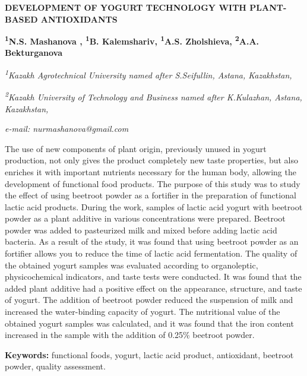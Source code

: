 \begin{articleheader}
{\bfseries DEVELOPMENT OF YOGURT TECHNOLOGY WITH PLANT-BASED ANTIOXIDANTS}

{\bfseries
\textsuperscript{1}N.S. Mashanova\textsuperscript{\envelope } ,
\textsuperscript{1}B. Kalemshariv,
\textsuperscript{1}A.S. Zholshieva,
\textsuperscript{2}A.A. Bekturganova}
\end{articleheader}

\begin{affiliation}
\emph{\textsuperscript{1}Kazakh Agrotechnical University named after S.Seifullin, Astana, Kazakhstan,}

\emph{\textsuperscript{2}Kazakh University of Technology and Business named after K.Kulazhan, Astana, Kazakhstan,}

\emph{e-mail: nurmashanova@gmail.com}
\end{affiliation}

The use of new components of plant origin, previously unused in yogurt
production, not only gives the product completely new taste properties,
but also enriches it with important nutrients necessary for the human
body, allowing the development of functional food products. The purpose
of this study was to study the effect of using beetroot powder as a
fortifier in the preparation of functional lactic acid products. During
the work, samples of lactic acid yogurt with beetroot powder as a plant
additive in various concentrations were prepared. Beetroot powder was
added to pasteurized milk and mixed before adding lactic acid bacteria.
As a result of the study, it was found that using beetroot powder as an
fortifier allows you to reduce the time of lactic acid fermentation. The
quality of the obtained yogurt samples was evaluated according to
organoleptic, physicochemical indicators, and taste tests were
conducted. It was found that the added plant additive had a positive
effect on the appearance, structure, and taste of yogurt. The addition
of beetroot powder reduced the suspension of milk and increased the
water-binding capacity of yogurt. The nutritional value of the obtained
yogurt samples was calculated, and it was found that the iron content
increased in the sample with the addition of 0.25\% beetroot powder.

{\bfseries Keywords:} functional foods, yogurt, lactic acid product,
antioxidant, beetroot powder, quality assessment.

